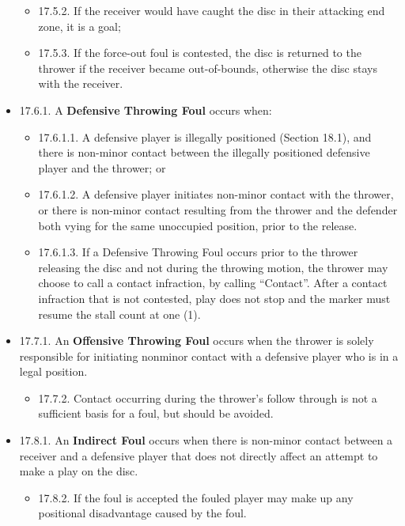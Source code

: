 \begin{itemize}[noitemsep]
\begin{itemize}
            \item 17.5.2. If the receiver would have caught the disc in their attacking end zone, it is a goal;
            \item 17.5.3. If the force-out foul is contested, the disc is returned to the thrower if the receiver became out-of-bounds, otherwise the disc stays with the receiver.
        \end{itemize}
    \item 17.6.1. A \textbf{Defensive Throwing Foul} occurs when:
        \begin{itemize}
            \item 17.6.1.1. A defensive player is illegally positioned (Section 18.1), and there is non-minor contact between the illegally positioned defensive player and the thrower; or
            \item 17.6.1.2. A defensive player initiates non-minor contact with the thrower, or there is non-minor contact resulting from the thrower and the defender both vying for the same unoccupied position, prior to the release.
            \item 17.6.1.3. If a Defensive Throwing Foul occurs prior to the thrower releasing the disc and not during the throwing motion, the thrower may choose to call a contact infraction, by calling “Contact”. After a contact infraction that is not contested, play does not stop and the marker must resume the stall count at one (1).
        \end{itemize}
    \item 17.7.1. An \textbf{Offensive Throwing Foul} occurs when the thrower is solely responsible for initiating nonminor contact with a defensive player who is in a legal position.
        \begin{itemize}
            \item 17.7.2. Contact occurring during the thrower's follow through is not a sufficient basis for a foul, but should be avoided.
        \end{itemize}
    \item 17.8.1. An \textbf{Indirect Foul} occurs when there is non-minor contact between a receiver and a defensive player that does not directly affect an attempt to make a play on the disc.
        \begin{itemize}
            \item 17.8.2. If the foul is accepted the fouled player may make up any positional disadvantage caused by the foul.
        \end{itemize}

\end{itemize}
